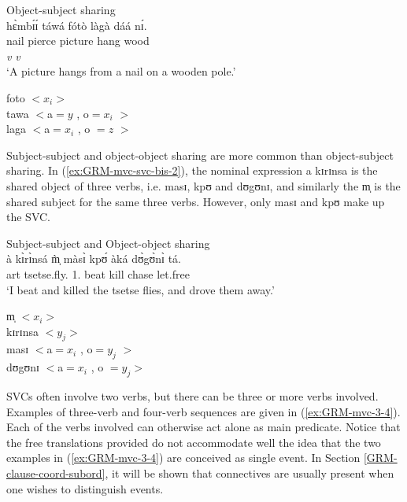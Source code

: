 
\ea\label{ex:GRM-arg-sh-objsubj}{\rm Object-subject sharing}\\
\glll  hɛ̀mbɪ́ɪ́ táwá fótò làgà dáá nɪ́.\\
nail pierce picture hang wood  {\postp}\\
{} {\it v} {}  {\it v}\\
 \glt `A picture hangs from a nail on a wooden pole.'

{\sls foto} $<x_i>$\\
{\sls tawa} $<${\sc a}$ =  y$ ,  {\sc o}$=x_i$  $> $\\
{\sls laga} $<${\sc a}$ = x_i$ , {\sc o} $= z $  $ >$\\
\z




Subject-subject and object-object sharing are more common than object-sub\-ject
sharing. In (\ref{ex:GRM-mvc-svc-bis-2}), the nominal expression {\sls a 
 kɪrɪnsa} is the shared object of three verbs, i.e. {\sls masɪ}, {\sls kpʊ} and {\sls dʊgʊnɪ}, and similarly the  {\sls m̩} is the shared subject for the same three verbs. However, only {\sls masɪ} and {\sls kpʊ}  make up the SVC. 

\begin{exe}

\ex\label{ex:GRM-mvc-svc-bis-2}{\rm Subject-subject and Object-object sharing}\\
\gll à  kɪ̀rɪ̀nsá   m̩̀   màsɪ̀   kpʊ́ àká dʊ̀gʊ̀nɪ̀ tá.\\
{\sc art}  tsetse.fly.{\pl}   {1.\sg}    beat   kill   {\conn} 
chase   let.free\\
\glt `I beat and killed the tsetse flies, and drove them away.'

{\sls m̩} $<x_i>$\\
{\sls kɪrɪnsa} $<y_j>$\\
{\sls masɪ} $<${\sc a}$ =  x_i$ ,  {\sc o}$=y_j$  $> $\\
{\sls dʊgʊnɪ} $<${\sc a}$ = x_i$ , {\sc o} $= y_j  >$\\
 
\end{exe}

SVCs often involve two verbs, but there can be three or more verbs involved. 
Examples of three-verb and four-verb sequences are given in
(\ref{ex:GRM-mvc-3-4}). Each of the verbs involved can otherwise act alone as
main
predicate. Notice that the free translations provided do not accommodate well
the idea that
the two examples in (\ref{ex:GRM-mvc-3-4}) are conceived as single event.
In Section \ref{GRM-clause-coord-subord},  it will be shown that connectives
are usually present  when one wishes to distinguish events.


